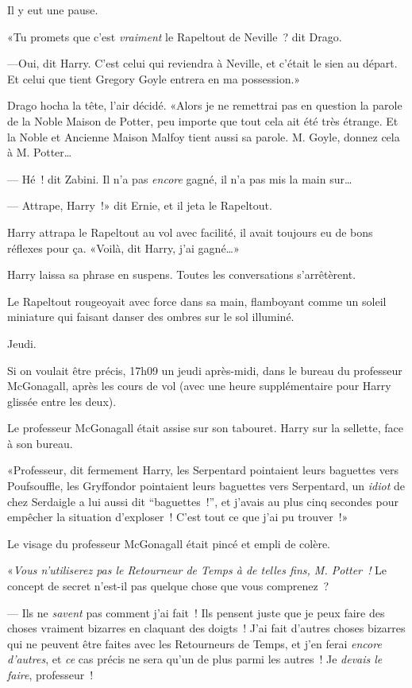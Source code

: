 Il y eut une pause.

«Tu promets que c'est \emph{vraiment} le Rapeltout de Neville~? dit Drago.

---Oui, dit Harry. C'est celui qui reviendra à Neville, et c'était le sien au départ. Et celui que tient Gregory Goyle entrera en ma possession.»

Drago hocha la tête, l'air décidé. «Alors je ne remettrai pas en question la parole de la Noble Maison de Potter, peu importe que tout cela ait été très étrange. Et la Noble et Ancienne Maison Malfoy tient aussi sa parole. M. Goyle, donnez cela à M. Potter…

--- Hé~! dit Zabini. Il n'a pas \emph{encore} gagné, il n'a pas mis la main sur…

--- Attrape, Harry~!» dit Ernie, et il jeta le Rapeltout.

Harry attrapa le Rapeltout au vol avec facilité, il avait toujours eu de bons réflexes pour ça. «Voilà, dit Harry, j'ai gagné…»

Harry laissa sa phrase en suspens. Toutes les conversations s'arrêtèrent.

Le Rapeltout rougeoyait avec force dans sa main, flamboyant comme un soleil miniature qui faisant danser des ombres sur le sol illuminé.

\later

Jeudi.

Si on voulait être précis, 17h09 un jeudi après-midi, dans le bureau du professeur McGonagall, après les cours de vol (avec une heure supplémentaire pour Harry glissée entre les deux).

Le professeur McGonagall était assise sur son tabouret. Harry sur la sellette, face à son bureau.

«Professeur, dit fermement Harry, les Serpentard pointaient leurs baguettes vers Poufsouffle, les Gryffondor pointaient leurs baguettes vers Serpentard, un \emph{idiot} de chez Serdaigle a lui aussi dit “baguettes~!”, et j'avais au plus cinq secondes pour empêcher la situation d'exploser~! C'est tout ce que j'ai pu trouver~!»

Le visage du professeur McGonagall était pincé et empli de colère.

«\emph{Vous n'utiliserez pas le Retourneur de Temps à de telles fins, M. Potter~!} Le concept de secret n'est-il pas quelque chose que vous comprenez~?

--- Ils ne \emph{savent} pas comment j'ai fait~! Ils pensent juste que je peux faire des choses vraiment bizarres en claquant des doigts~! J'ai fait d'autres choses bizarres qui ne peuvent être faites avec les Retourneurs de Temps, et j'en ferai \emph{encore d'autres}, et \emph{ce} cas précis ne sera qu'un de plus parmi les autres~! Je \emph{devais le faire}, professeur~!

